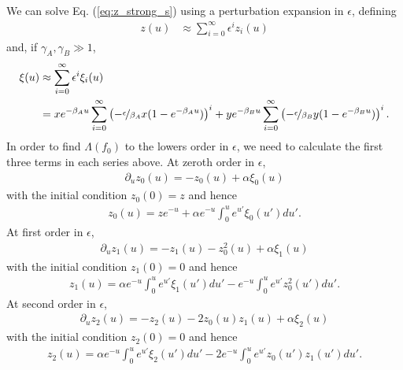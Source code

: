 \documentclass[11pt]{article}
\begin{document}
We can solve Eq. (\ref{eq:z_strong_s}) using a perturbation expansion in $\epsilon$, defining 
\begin{align}
    z (u) &\approx \sum_{i=0}^\infty \epsilon^i z_i (u) \label{eq:z(u)_series}
\end{align}
and, if $\gamma_A,\gamma_B \gg 1$,
\begin{align}
    \xi (u) &\approx \sum_{i=0}^\infty \epsilon^i \xi_i (u) \\ \nonumber
    &= xe^{-\beta_A u} \sum_{i=0}^\infty \left(-\nicefrac{\epsilon}{\beta_A}x(1-e^{-\beta_A u})\right)^i
    + ye^{-\beta_B u} \sum_{i=0}^\infty \left(-\nicefrac{\epsilon}{\beta_B}y(1-e^{-\beta_B u})\right)^i
    .\label{eq:f(u)_series}
\end{align}
In order to find $\Lambda(f_0)$ to the lowers order in $\epsilon$, we need to calculate the first three terms in each series above.
At zeroth order in $\epsilon$,
\begin{align}
    \partial_u z_0(u) = -z_0(u) + \alpha \xi_0(u)  
\end{align}
with the initial condition $z_0(0) = z$ and hence 
\begin{align}
    z_0(u) = ze^{-u} + \alpha e^{-u} \int_0^u e^{u'} \xi_0(u') du'.
\end{align}
At first order in $\epsilon$,
\begin{align}
    \partial_u z_1(u) = -z_1(u) -z_0^2(u) + \alpha \xi_1(u) 
\end{align}
with the initial condition $z_1(0) = 0$ and hence 
\begin{align}
    z_1(u) = \alpha e^{-u} \int_0^u e^{u'} \xi_1(u') du' - e^{-u} \int_0^u e^{u'} z_0^2 (u') du'.
\end{align}
At second order in $\epsilon$,
\begin{align}
    \partial_u z_2(u) = -z_2(u) -2z_0(u)z_1(u) + \alpha \xi_2(u) 
\end{align}
with the initial condition $z_2(0) = 0$ and hence 
\begin{align}
    z_2(u) = \alpha e^{-u} \int_0^u e^{u'} \xi_2(u') du' - 2e^{-u} \int_0^u e^{u'} z_0(u')z_1(u') du'.
\end{align}
\end{document}
